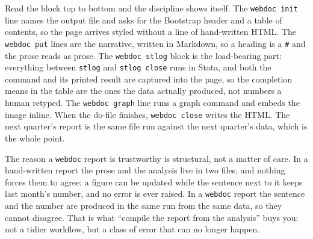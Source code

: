 \documentclass[
    a4paper,
    fontsize=10pt,
    twoside=true,
    numbers=noenddot,
]{kaobook}
\newenvironment{vizcallout}[1][Visualization to build]{%
    \begin{vizbox}[frametitle={#1}]%
}{%
    \end{vizbox}%
}
\begin{document}
Read the block top to bottom and the discipline shows itself. The \texttt{webdoc init} line names the output file and asks for the Bootstrap header and a table of contents, so the page arrives styled without a line of hand-written HTML. The \texttt{webdoc put} lines are the narrative, written in Markdown, so a heading is a \texttt{\#} and the prose reads as prose. The \texttt{webdoc stlog} block is the load-bearing part: everything between \texttt{stlog} and \texttt{stlog close} runs in Stata, and both the command and its printed result are captured into the page, so the completion means in the table are the ones the data actually produced, not numbers a human retyped. The \texttt{webdoc graph} line runs a graph command and embeds the image inline. When the do-file finishes, \texttt{webdoc close} writes the HTML. The next quarter's report is the same file run against the next quarter's data, which is the whole point.

\begin{vizcallout}[Why the numbers cannot lie]
The reason a \texttt{webdoc} report is trustworthy is structural, not a matter of care. In a hand-written report the prose and the analysis live in two files, and nothing forces them to agree; a figure can be updated while the sentence next to it keeps last month's number, and no error is ever raised. In a \texttt{webdoc} report the sentence and the number are produced in the same run from the same data, so they cannot disagree. That is what \enquote{compile the report from the analysis} buys you: not a tidier workflow, but a class of error that can no longer happen.
\end{vizcallout}
\end{document}
